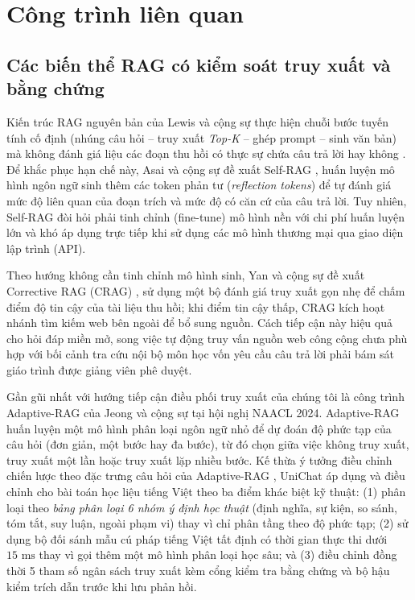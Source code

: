 \documentclass{IEEEtran}
\begin{document}
\section{Công trình liên quan}
\label{sec:related_work}

\subsection{Các biến thể RAG có kiểm soát truy xuất và bằng chứng}
Kiến trúc RAG nguyên bản của Lewis và cộng sự \cite{lewis2020rag} thực hiện chuỗi bước tuyến tính cố định (nhúng câu hỏi -- truy xuất \textit{Top-K} -- ghép prompt -- sinh văn bản) mà không đánh giá liệu các đoạn thu hồi có thực sự chứa câu trả lời hay không \cite{gao2023rag, huang2025survey}. Để khắc phục hạn chế này, Asai và cộng sự đề xuất Self-RAG \cite{asai2024selfrag}, huấn luyện mô hình ngôn ngữ sinh thêm các token phản tư (\textit{reflection tokens}) để tự đánh giá mức độ liên quan của đoạn trích và mức độ có căn cứ của câu trả lời. Tuy nhiên, Self-RAG đòi hỏi phải tinh chỉnh (fine-tune) mô hình nền với chi phí huấn luyện lớn và khó áp dụng trực tiếp khi sử dụng các mô hình thương mại qua giao diện lập trình (API).

Theo hướng không cần tinh chỉnh mô hình sinh, Yan và cộng sự đề xuất Corrective RAG (CRAG) \cite{yan2024crag}, sử dụng một bộ đánh giá truy xuất gọn nhẹ để chấm điểm độ tin cậy của tài liệu thu hồi; khi điểm tin cậy thấp, CRAG kích hoạt nhánh tìm kiếm web bên ngoài để bổ sung nguồn. Cách tiếp cận này hiệu quả cho hỏi đáp miền mở, song việc tự động truy vấn nguồn web công cộng chưa phù hợp với bối cảnh tra cứu nội bộ môn học vốn yêu cầu câu trả lời phải bám sát giáo trình được giảng viên phê duyệt.

Gần gũi nhất với hướng tiếp cận điều phối truy xuất của chúng tôi là công trình Adaptive-RAG của Jeong và cộng sự \cite{jeong2024adaptiverag} tại hội nghị NAACL 2024. Adaptive-RAG huấn luyện một mô hình phân loại ngôn ngữ nhỏ để dự đoán độ phức tạp của câu hỏi (đơn giản, một bước hay đa bước), từ đó chọn giữa việc không truy xuất, truy xuất một lần hoặc truy xuất lặp nhiều bước. Kế thừa ý tưởng điều chỉnh chiến lược theo đặc trưng câu hỏi của Adaptive-RAG \cite{jeong2024adaptiverag}, UniChat áp dụng và điều chỉnh cho bài toán học liệu tiếng Việt theo ba điểm khác biệt kỹ thuật: (1) phân loại theo \textit{bảng phân loại 6 nhóm ý định học thuật} (định nghĩa, sự kiện, so sánh, tóm tắt, suy luận, ngoài phạm vi) thay vì chỉ phân tầng theo độ phức tạp; (2) sử dụng bộ đối sánh mẫu cú pháp tiếng Việt tất định có thời gian thực thi dưới $15\text{~ms}$ thay vì gọi thêm một mô hình phân loại học sâu; và (3) điều chỉnh đồng thời 5 tham số ngân sách truy xuất kèm cổng kiểm tra bằng chứng và bộ hậu kiểm trích dẫn trước khi lưu phản hồi.
\end{document}

